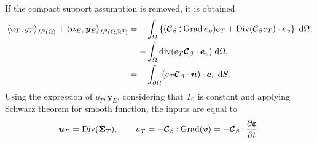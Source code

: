 If the compact support assumption is removed, it is obtained
\begin{equation}\label{eq:balIntThElas}
	\begin{aligned}
	\left\langle u_T, y_T \right\rangle_{L^2(\Omega)} + \left\langle \bm{u}_E, \bm{y}_E \right\rangle_{L^2(\Omega, \mathbb{R}^3)} &= -\int_\Omega \left\{(\bm{\mathcal{C}}_\beta \cddot \Grad \bm{e}_v) e_T + \Div(\bm{\mathcal{C}}_\beta e_T) \cdot \bm{e}_v \right\} \d\Omega, \\
	&= -\int_{\Omega} \div(e_T \bm{\mathcal{C}}_\beta \cdot \bm{e}_v ) \d\Omega, \\
	&= -\int_{\partial \Omega} (e_T \bm{\mathcal{C}}_\beta \cdot \bm{n}) \cdot \bm{e}_v  \d{S}.
	\end{aligned}
\end{equation}
Using the expression of $y_T, \bm{y}_E$, considering that $T_0$ is constant and applying Schwarz theorem for smooth function, the inputs are equal to
\begin{equation*}
\bm{u}_E =  \Div(\bm{\Sigma}_T), \qquad u_T = - \bm{\mathcal{C}}_\beta \cddot  \Grad(\bm{v}) = - \bm{\mathcal{C}}_\beta \cddot  \diffp{\bm{\varepsilon}}{t} .
\end{equation*}

